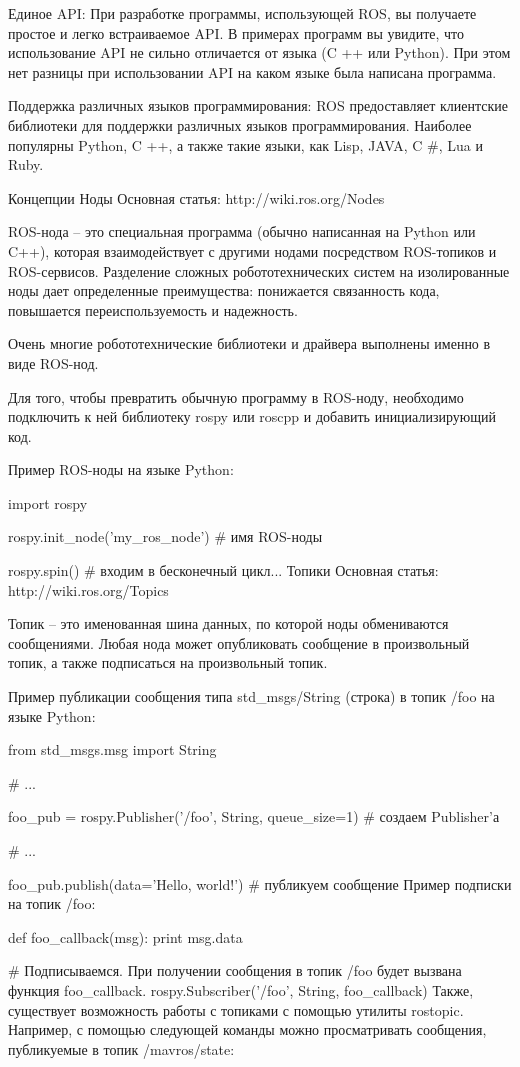 Единое API: При разработке программы, использующей ROS, вы получаете простое и легко встраиваемое API. В примерах программ вы увидите, что использование API не сильно отличается от языка (C ++ или Python). При этом нет разницы при использовании API на каком языке была написана программа.

Поддержка различных языков программирования: ROS предоставляет клиентские библиотеки для поддержки различных языков программирования. Наиболее популярны Python, C ++, а также такие языки, как Lisp, JAVA, C #, Lua и Ruby.

Концепции
Ноды
Основная статья: http://wiki.ros.org/Nodes

ROS-нода – это специальная программа (обычно написанная на Python или C++), которая взаимодействует с другими нодами посредством ROS-топиков и ROS-сервисов. Разделение сложных робототехнических систем на изолированные ноды дает определенные преимущества: понижается связанность кода, повышается переиспользуемость и надежность.

Очень многие робототехнические библиотеки и драйвера выполнены именно в виде ROS-нод.

Для того, чтобы превратить обычную программу в ROS-ноду, необходимо подключить к ней библиотеку rospy или roscpp и добавить инициализирующий код.

Пример ROS-ноды на языке Python:

import rospy

rospy.init_node('my_ros_node')  # имя ROS-ноды

rospy.spin()  # входим в бесконечный цикл...
Топики
Основная статья: http://wiki.ros.org/Topics

Топик – это именованная шина данных, по которой ноды обмениваются сообщениями. Любая нода может опубликовать сообщение в произвольный топик, а также подписаться на произвольный топик.

Пример публикации сообщения типа std_msgs/String (строка) в топик /foo на языке Python:

from std_msgs.msg import String

# ...

foo_pub = rospy.Publisher('/foo', String, queue_size=1)  # создаем Publisher'а

# ...

foo_pub.publish(data='Hello, world!')  # публикуем сообщение
Пример подписки на топик /foo:

def foo_callback(msg):
print msg.data

# Подписываемся. При получении сообщения в топик /foo будет вызвана функция foo_callback.
rospy.Subscriber('/foo', String, foo_callback)
Также, существует возможность работы с топиками с помощью утилиты rostopic. Например, с помощью следующей команды можно просматривать сообщения, публикуемые в топик /mavros/state:

